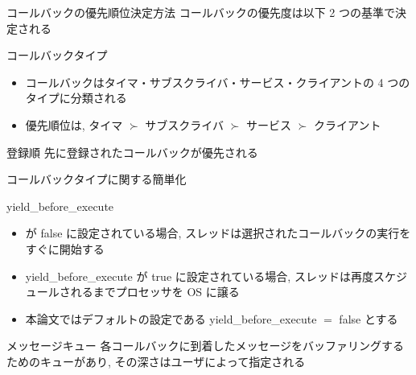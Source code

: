 \begin{frame}{コールバックの優先順位決定方法}
    コールバックの優先度は以下 2 つの基準で決定される

    \begin{block}{コールバックタイプ}
        \setlength{\linewidth}{0.98\columnwidth}
        \begin{itemize}
            \item コールバックはタイマ・サブスクライバ・サービス・クライアントの 4 つのタイプに分類される
            \item 優先順位は, タイマ $\succ$ サブスクライバ $\succ$ サービス $\succ$ クライアント 
        \end{itemize}
    \end{block}

    \begin{block}{登録順}
        先に登録されたコールバックが優先される
    \end{block}
\end{frame}

\begin{frame}{コールバックタイプに関する簡単化}
\end{frame}

\begin{frame}{yield\_before\_execute}
    \begin{itemize}
        \item {} が false に設定されている場合, スレッドは選択されたコールバックの実行をすぐに開始する
        \item yield\_before\_execute が true に設定されている場合, スレッドは再度スケジュールされるまでプロセッサを OS に譲る
        \item 本論文ではデフォルトの設定である yield\_before\_execute $=$ false とする
    \end{itemize}
\end{frame}

\begin{frame}{メッセージキュー}
    各コールバックに到着したメッセージをバッファリングするためのキューがあり, その深さはユーザによって指定される
\end{frame}


